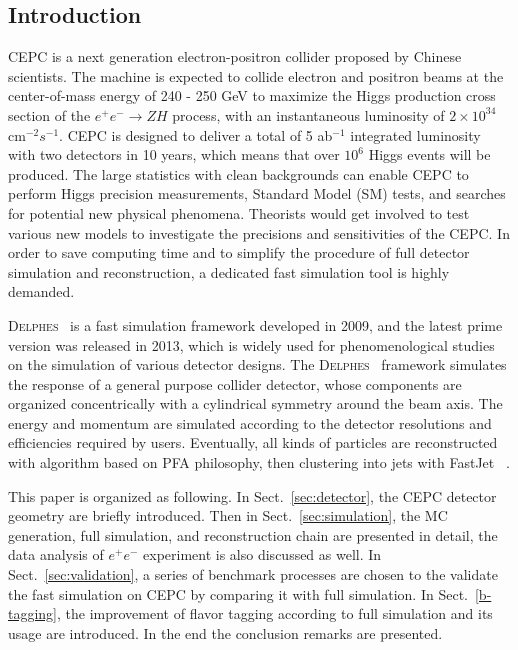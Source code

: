 \documentclass[a4paper,10pt,twoside]{cpc-hepnp}
\begin{document}
\begin{multicols}{2}


\section{Introduction}\label{sec:intro}

CEPC\cite{ref:cepc_det, ref:cepc_acc} is a next generation electron-positron collider proposed by Chinese scientists.
The machine is expected to collide electron and positron beams at the center-of-mass energy of 240 - 250 GeV
to maximize the Higgs production cross section of the $e^+e^- \to ZH$ process, with an instantaneous luminosity of $2\times10^{34}$ cm$^{-2} s^{-1}$.
CEPC is designed to deliver a total of 5 ab$^{-1}$ integrated luminosity with two detectors in 10 years,
which means that over $10^6$ Higgs events will be produced.
The large statistics with clean backgrounds can enable CEPC to perform Higgs precision measurements,
Standard Model (SM) tests, and searches for potential new physical phenomena.
Theorists would get involved to test various new models to investigate the precisions and sensitivities of the CEPC.
In order to save computing time and to simplify the procedure of full detector simulation and reconstruction,
a dedicated fast simulation tool is highly demanded.

{\textsc{Delphes}~}\cite{ref:delphes} is a fast simulation framework developed in 2009, and the latest prime version was released in 2013,
which is widely used for phenomenological studies on the simulation of various detector designs.
The {\textsc{Delphes}~} framework simulates the response of a general purpose collider detector,
whose components are organized concentrically with a cylindrical symmetry around the beam axis.
The energy and momentum are simulated according to the detector resolutions and efficiencies required by users.
Eventually, all kinds of particles are reconstructed with algorithm based on PFA\cite{ref:pfa} philosophy,
then clustering into jets with FastJet~\cite{ref:fastjet} .

This paper is organized as following.  In Sect.{~\ref{sec:detector}}, the CEPC detector geometry are briefly introduced.
Then in Sect.{~\ref{sec:simulation}}, the MC generation, full simulation, and reconstruction chain are presented in detail,
the data analysis of $e^+e^-$  experiment is also discussed as well.
In Sect.{~\ref{sec:validation}}, a series of benchmark processes are chosen to the validate the fast simulation on CEPC
by comparing it with full simulation.
In Sect.{~\ref{b-tagging}}, the improvement of flavor tagging according to full simulation and its usage are introduced.
In the end the conclusion remarks are presented.


\end{multicols}
\end{document}
